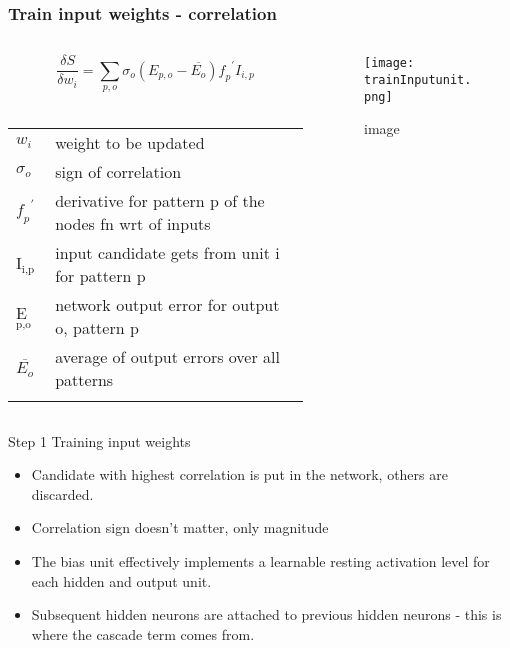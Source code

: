 \documentclass[presentation]{beamer}
\begin{document}
\begin{frame}
  \frametitle{Train input weights - correlation}
	\begin{columns}[t]
		\begin{column}{0.5\textwidth}
      $$ \frac{\delta S}{\delta w_{i}} = \sum_{p,o} \sigma_{o}(E_{p,o} - \overline{E_{o}}) \mathit{f_{p}}^{\prime} I_{i,p} $$
     \\ 
      \begin{center}
        \begin{tabular}{ll}
          \(\mathit{w_{i}}\) & \tiny{weight to be updated}  \\
          \(\sigma_{o}\) & \tiny{sign of correlation}  \\
          \(\mathit{f_{p}}^{\prime}\) & \tiny{derivative for pattern p of the nodes fn wrt of inputs} \\
          I\(_{\text{i,p}}\) & \tiny{input candidate gets from unit i for pattern p}  \\
          E\(_{\text{p,o}}\) & \tiny{network output error for output o, pattern p} \\
          \(\overline{E_{o}}\) & \tiny{average of output errors over all patterns} \\
          & \\
        \end{tabular}
      \end{center}
		\end{column}
		\begin{column}{0.5\textwidth}
      \begin{figure}
        \centering
        \texttt{[image: trainInputunit.png]}
        \caption{image}
      \end{figure}			
		\end{column}
	\end{columns}
\end{frame}



\begin{frame}{Step 1 Training input weights}
  \begin{itemize}
    \item Candidate with highest correlation is put in the network, others are discarded.
    \item Correlation sign doesn't matter, only magnitude
    \item The bias unit effectively implements a learnable resting activation level for each hidden and output unit.
    \item Subsequent hidden neurons are attached to previous hidden neurons - this is where the cascade term comes from.
  \end{itemize}
\end{frame}
\end{document}
